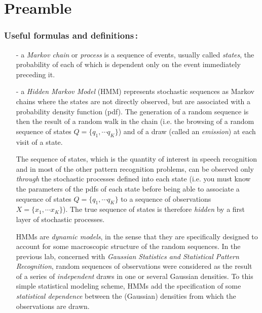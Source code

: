 \documentclass[twoside,a4paper,titlepage]{article}
\begin{document}
\clearpage

\tableofcontents

\bigskip
\section{Preamble}
\subsubsection*{Useful formulas and definitions\,:}
\begin{itemize}
%
\item[-] a {\em Markov chain} or {\em process} is a sequence of events,
usually called {\em states}, the probability of each of which is dependent
only on the event immediately preceding it.
%
\item[-] a {\em Hidden Markov Model} (HMM) represents stochastic sequences
as Markov chains where the states are not directly observed, but are
associated with a probability density function (pdf). The generation of a
random sequence is then the result of a random walk in the chain (i.e. the
browsing of a random sequence of states $Q=\{q_1,\cdots q_K\}$) and of a
draw (called an {\em emission}) at each visit of a state.

The sequence of states, which is the quantity of interest in speech
recognition and in most of the other pattern recognition problems, can be
observed only {\em through} the stochastic processes defined into each
state (i.e. you must know the parameters of the pdfs of each state before
being able to associate a sequence of states $Q=\{q_1,\cdots q_K\}$ to a
sequence of observations $X=\{x_1,\cdots x_K\}$). The true sequence of
states is therefore {\em hidden} by a first layer of stochastic processes.

HMMs are {\em dynamic models}, in the sense that they are specifically
designed to account for some macroscopic structure of the random
sequences. In the previous lab, concerned with {\em Gaussian Statistics and
Statistical Pattern Recognition}, random sequences of observations were
considered as the result of a series of {\em independent} draws in one or
several Gaussian densities. To this simple statistical modeling scheme,
HMMs add the specification of some {\em statistical dependence} between the
(Gaussian) densities from which the observations are drawn.


\end{itemize}
\end{document}
